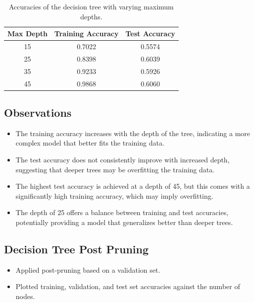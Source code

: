 \documentclass[12pt]{article}
\begin{document}
    \begin{table}[h]
\centering
\begin{tabular}{@{}ccc@{}}
\toprule
Max Depth & Training Accuracy & Test Accuracy \\ \midrule
15        & 0.7022            & 0.5574        \\
25        & 0.8398            & 0.6039        \\
35        & 0.9233            & 0.5926        \\
45        & 0.9868            & 0.6060        \\ \bottomrule
\end{tabular}
\caption{Accuracies of the decision tree with varying maximum depths.}
\end{table}

\subsection*{Observations}
\begin{itemize}
    \item The training accuracy increases with the depth of the tree, indicating a more complex model that better fits the training data.
    \item The test accuracy does not consistently improve with increased depth, suggesting that deeper trees may be overfitting the training data.
    \item The highest test accuracy is achieved at a depth of 45, but this comes with a significantly high training accuracy, which may imply overfitting.
    \item The depth of 25 offers a balance between training and test accuracies, potentially providing a model that generalizes better than deeper trees.
\end{itemize}

\subsection{Decision Tree Post Pruning}
    \begin{itemize}
        \item Applied post-pruning based on a validation set.
        \item Plotted training, validation, and test set accuracies against the number of nodes.
    \end{itemize}
\end{document}
